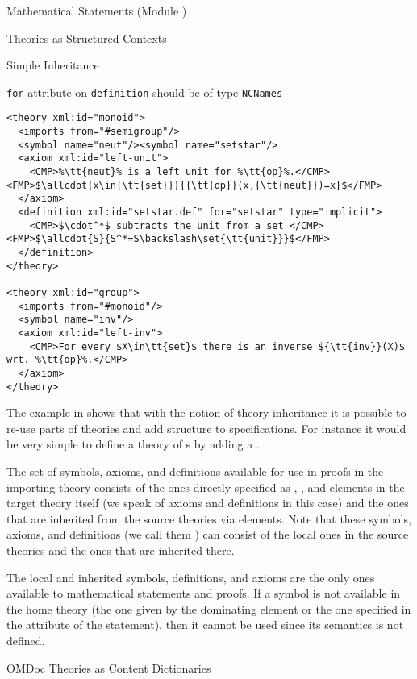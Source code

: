 \begin{tchapter}[id=statements,short=Mathematical Statements]{Mathematical Statements (Module {})}
\begin{tsection}[id=theories]{Theories as Structured Contexts}
\begin{tsubsection}[id=inheritance]{Simple Inheritance}
\begin{erratum}[reported-by=Michael Kohlhase,date=2009-08-11]{{\texttt{for}} attribute on
    {\texttt{definition}} should be of type {\texttt{NCNames}}}
\begin{lstlisting}[label=lst:def-group,escapechar=\%,mathescape,
  caption={A Structured Development of Algebraic Theories in {\omdoc}},
  index={theory,symbol,axiom,imports}]
<theory xml:id="monoid">
  <imports from="#semigroup"/>
  <symbol name="neut"/><symbol name="setstar"/>
  <axiom xml:id="left-unit">
    <CMP>%\tt{neut}% is a left unit for %\tt{op}%.</CMP><FMP>$\allcdot{x\in{\tt{set}}}{{\tt{op}}(x,{\tt{neut}})=x}$</FMP>
  </axiom>
  <definition xml:id="setstar.def" for="setstar" type="implicit">
    <CMP>$\cdot^*$ subtracts the unit from a set </CMP><FMP>$\allcdot{S}{S^*=S\backslash\set{\tt{unit}}}$</FMP>
  </definition>
</theory>

<theory xml:id="group"> 
  <imports from="#monoid"/>
  <symbol name="inv"/>
  <axiom xml:id="left-inv">
    <CMP>For every $X\in\tt{set}$ there is an inverse ${\tt{inv}}(X)$ wrt. %\tt{op}%.</CMP>
  </axiom>
</theory>
\end{lstlisting}
\end{erratum}

The example in {} shows that with the notion of theory inheritance it
is possible to re-use parts of theories and add structure to specifications. For instance
it would be very simple to define a theory of {s} by adding a
{}.

The set of symbols, axioms, and definitions available for use in proofs in the importing
theory consists of the ones directly specified as {}, {},
and {} elements in the target theory itself (we speak of
{} axioms and definitions in this case) and the ones that are inherited from
the source theories via {} elements.  Note that these symbols, axioms,
and definitions (we call them {}) can consist of the local ones in the
source theories and the ones that are inherited there.

The local and inherited symbols, definitions, and axioms are the only ones
available to mathematical statements and proofs. If a symbol is not available in
the home theory (the one given by the dominating {} element or the
one specified in the {} attribute of the statement),
then it cannot be used since its semantics is not defined.
\end{tsubsection}

\begin{tsubsection}[id=identifying]{OMDoc Theories as Content Dictionaries}
  

\end{tsubsection}
\end{tsection}
\end{tchapter}
